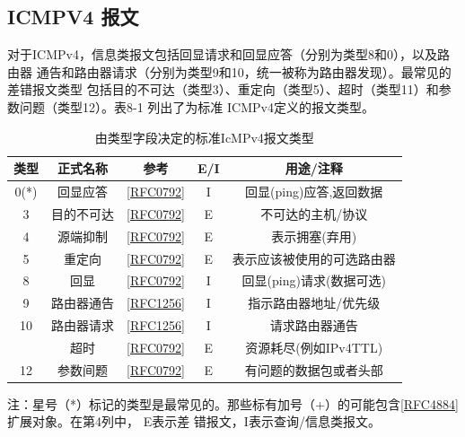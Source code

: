\subsection{ICMPV4 报文}
对于ICMPv4，信息类报文包括回显请求和回显应答（分别为类型8和0），以及路由器
通告和路由器请求（分别为类型9和10，统一被称为路由器发现）。最常见的差错报文类型
包括目的不可达（类型3）、重定向（类型5）、超时（类型11）和参数问题（类型12）。表8-1
列出了为标准 ICMPv4定义的报文类型。

\begin{table}[H]
  \scriptsize
  \centering
  \caption{由类型字段决定的标准IcMPv4报文类型}
  \begin{tabular}{c|c|c|c|c}
    \hline
    类型   & 正式名称  & 参考 & E/I & 用途/注释            \\ \hline
    0(*) & 回显应答  &
    \href{https://www.rfc-editor.org/rfc/rfc0792}{[RFC0792]}  & I   &
    回显(ping)应答,返回数据  \\ \hline
    3    & 目的不可达 &
    \href{https://www.rfc-editor.org/rfc/rfc0792}{[RFC0792]}  & E   &
    不可达的主机/协议        \\ \hline
    4    & 源端抑制  &
    \href{https://www.rfc-editor.org/rfc/rfc0792}{[RFC0792]}  & E   &
    表示拥塞(弃用)         \\ \hline
    5    & 重定向   &
    \href{https://www.rfc-editor.org/rfc/rfc0792}{[RFC0792]}  & E   &
    表示应该被使用的可选路由器    \\ \hline
    8    & 回显    &
    \href{https://www.rfc-editor.org/rfc/rfc0792}{[RFC0792]}  & I   &
    回显(ping)请求(数据可选) \\ \hline
    9    & 路由器通告 &
    \href{https://www.rfc-editor.org/rfc/rfc1256}{[RFC1256]}  & I   &
    指示路由器地址/优先级      \\ \hline
    10   & 路由器请求 &
    \href{https://www.rfc-editor.org/rfc/rfc1256}{[RFC1256]}  & I   &
    请求路由器通告          \\ \hline
    & 超时    &
    \href{https://www.rfc-editor.org/rfc/rfc0792}{[RFC0792]}  & E   &
    资源耗尽(例如IPv4TTL)  \\ \hline
    12   & 参数间题  &
    \href{https://www.rfc-editor.org/rfc/rfc0792}{[RFC0792]}  & E   &
    有问题的数据包或者头部      \\ \hline
  \end{tabular}
\end{table}

注：星号（*）标记的类型是最常见的。那些标有加号（+）的可能包含\href{https://www.rfc-editor.org/rfc/rfc4884}{[RFC4884]}
扩展对象。在第4列中，
E表示差 错报文，I表示查询/信息类报文。

